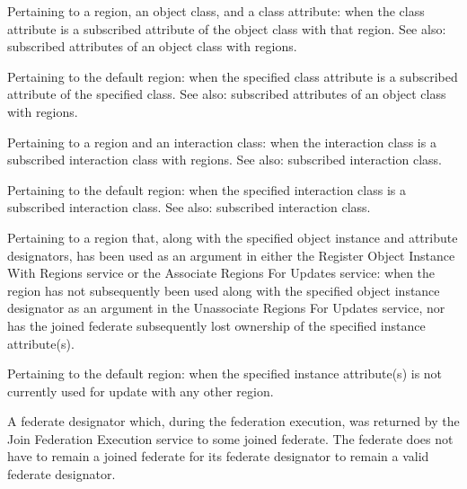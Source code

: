 \begin{stdalphalist}
    \item Pertaining to a region, an object class, and a class attribute: when the class attribute is a subscribed attribute of the object class with that region. See also: subscribed attributes of an object class with regions.
    \item Pertaining to the default region: when the specified class attribute is a subscribed attribute of the specified class. See also: subscribed attributes of an object class with regions.
\end{stdalphalist}

\begin{stdalphalist}
    \item Pertaining to a region and an interaction class: when the interaction class is a subscribed interaction class with regions. See also: subscribed interaction class.

    \clearpage
    \item Pertaining to the default region: when the specified interaction class is a subscribed interaction class. See also: subscribed interaction class.
\end{stdalphalist}

\begin{stdalphalist}
    \item Pertaining to a region that, along with the specified object instance and attribute designators, has been used as an argument in either the Register Object Instance With Regions service or the Associate Regions For Updates service: when the region has not subsequently been used along with the specified object instance designator as an argument in the Unassociate Regions For Updates service, nor has the joined federate subsequently lost ownership of the specified instance attribute(s).
    \item Pertaining to the default region: when the specified instance attribute(s) is not currently used for update with any other region.
\end{stdalphalist}

 A federate designator which, during the federation execution, was returned by the Join Federation Execution service to some joined federate. The federate does not have to remain a joined federate for its federate designator to remain a valid federate designator.

